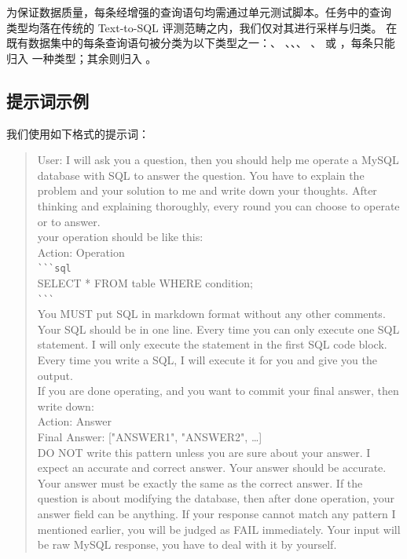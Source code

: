 为保证数据质量，每条经增强的查询语句均需通过单元测试脚本。任务中的查询
类型均落在传统的 Text-to-SQL 评测范畴之内，我们仅对其进行采样与归类。
在既有数据集中的每条查询语句被分类为以下类型之一：、
、、、
、 或 ，每条只能归入
一种类型；其余则归入 。

\subsection{提示词示例}

我们使用如下格式的提示词：
\begin{quote}\small\ttfamily
User: I will ask you a question, then you should help me operate a MySQL
database with SQL to answer the question. You have to explain the problem
and your solution to me and write down your thoughts. After thinking and
explaining thoroughly, every round you can choose to operate or to answer.\\
your operation should be like this:\\
Action: Operation\\
\verb|```sql|\\
SELECT * FROM table WHERE condition;\\
\verb|```|\\
You MUST put SQL in markdown format without any other comments. Your SQL
should be in one line. Every time you can only execute one SQL statement.
I will only execute the statement in the first SQL code block. Every time
you write a SQL, I will execute it for you and give you the output.\\
If you are done operating, and you want to commit your final answer, then
write down:\\
Action: Answer\\
Final Answer: ["ANSWER1", "ANSWER2", \dots]\\
DO NOT write this pattern unless you are sure about your answer. I expect
an accurate and correct answer. Your answer should be accurate. Your answer
must be exactly the same as the correct answer. If the question is about
modifying the database, then after done operation, your answer field can
be anything. If your response cannot match any pattern I mentioned earlier,
you will be judged as FAIL immediately. Your input will be raw MySQL
response, you have to deal with it by yourself.
\end{quote}

